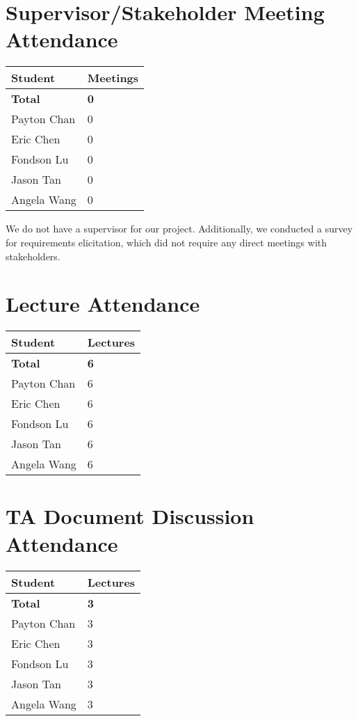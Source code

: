 \documentclass{article}
\begin{document}
\section{Supervisor/Stakeholder Meeting Attendance}

\begin{table}[H]
\centering
\begin{tabular}{ll}
\toprule
\textbf{Student} & \textbf{Meetings}\\
\midrule
\textbf{Total} & \textbf{0}\\
Payton Chan & 0\\
Eric Chen & 0\\
Fondson Lu & 0\\
Jason Tan & 0\\
Angela Wang & 0\\
\bottomrule
\end{tabular}
\end{table}

We do not have a supervisor for our project. Additionally, we conducted a survey
for requirements elicitation, which did not require any direct meetings with
stakeholders. 

\section{Lecture Attendance}

\begin{table}[H]
\centering
\begin{tabular}{ll}
\toprule
\textbf{Student} & \textbf{Lectures}\\
\midrule
\textbf{Total} & \textbf{6}\\
Payton Chan & 6\\
Eric Chen & 6\\
Fondson Lu & 6\\
Jason Tan & 6\\
Angela Wang & 6\\
\bottomrule
\end{tabular}
\end{table}


\section{TA Document Discussion Attendance}

\begin{table}[H]
\centering
\begin{tabular}{ll}
\toprule
\textbf{Student} & \textbf{Lectures}\\
\midrule
\textbf{Total} & \textbf{3}\\
Payton Chan & 3\\
Eric Chen & 3\\
Fondson Lu & 3\\
Jason Tan & 3\\
Angela Wang & 3\\
\bottomrule
\end{tabular}
\end{table}
\end{document}

